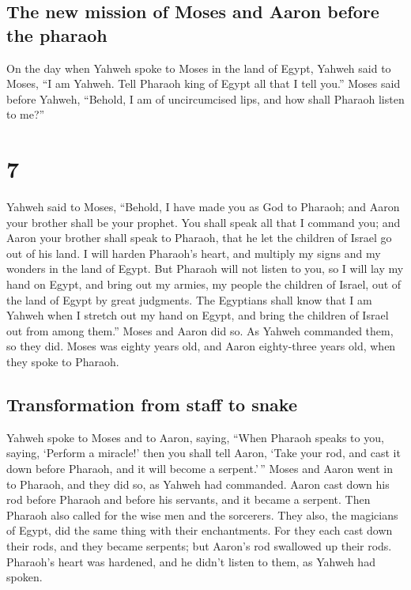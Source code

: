 \hypertarget{the-new-mission-of-moses-and-aaron-before-the-pharaoh}{%
\subsection{The new mission of Moses and Aaron before the
pharaoh}\label{the-new-mission-of-moses-and-aaron-before-the-pharaoh}}

 On the day when Yahweh spoke to Moses in the land of
Egypt,  Yahweh said to Moses, ``I am Yahweh. Tell Pharaoh
king of Egypt all that I tell you.''  Moses said before
Yahweh, ``Behold, I am of uncircumcised lips, and how shall Pharaoh
listen to me?''

\hypertarget{section-6}{%
\section{7}\label{section-6}}

 Yahweh said to Moses, ``Behold, I have made you as God to
Pharaoh; and Aaron your brother shall be your prophet. 
You shall speak all that I command you; and Aaron your brother shall
speak to Pharaoh, that he let the children of Israel go out of his land.
 I will harden Pharaoh's heart, and multiply my signs and
my wonders in the land of Egypt.  But Pharaoh will not
listen to you, so I will lay my hand on Egypt, and bring out my armies,
my people the children of Israel, out of the land of Egypt by great
judgments.  The Egyptians shall know that I am Yahweh when
I stretch out my hand on Egypt, and bring the children of Israel out
from among them.''  Moses and Aaron did so. As Yahweh
commanded them, so they did.  Moses was eighty years old,
and Aaron eighty-three years old, when they spoke to Pharaoh.

\hypertarget{transformation-from-staff-to-snake}{%
\subsection{Transformation from staff to
snake}\label{transformation-from-staff-to-snake}}

 Yahweh spoke to Moses and to Aaron, saying,
 ``When Pharaoh speaks to you, saying, `Perform a
miracle!' then you shall tell Aaron, `Take your rod, and cast it down
before Pharaoh, and it will become a serpent.'\,''  Moses
and Aaron went in to Pharaoh, and they did so, as Yahweh had commanded.
Aaron cast down his rod before Pharaoh and before his servants, and it
became a serpent.  Then Pharaoh also called for the wise
men and the sorcerers. They also, the magicians of Egypt, did the same
thing with their enchantments.  For they each cast down
their rods, and they became serpents; but Aaron's rod swallowed up their
rods.  Pharaoh's heart was hardened, and he didn't listen
to them, as Yahweh had spoken.

